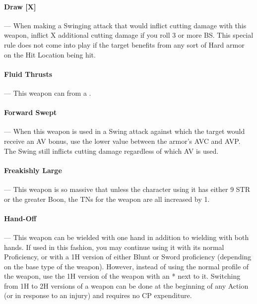 \documentclass[oneside,11pt,english]{book}
\begin{document}
\vspace{-5pt}\paragraph[Draw]{\label{wepqual:Draw}Draw [X]}---\quad
When making a Swinging attack that would inflict cutting damage with this
weapon, inflict X additional cutting damage if you roll 3 or more BS. This
special rule does not come into play if the target benefits from any sort of
Hard armor on the Hit Location being hit. 

\vspace{-5pt}\paragraph{\label{wepqual:Fluid Thrusts}Fluid Thrusts}---\quad
This weapon can  from a .

\vspace{-5pt}\paragraph{\label{wepqual:Forward Swept}Forward Swept}---\quad
When this weapon is used in a Swing attack against which the target would
receive an AV bonus, use the lower value between the armor’s AVC and AVP. The
Swing still inflicts cutting damage regardless of which AV is used. 

\vspace{-5pt}\paragraph{\label{wepqual:Freakishly Large}Freakishly Large}---\quad
This weapon is so massive that unless the character using it has either 9 STR or the greater  Boon, the TNs for the weapon are all increased by 1.

\vspace{-5pt}\paragraph{\label{wepqual:Hand-Off}Hand-Off}---\quad
This weapon can be wielded with one hand in addition to wielding with both
hands. If used in this fashion, you may continue using it with its normal
Proficiency, or with a 1H version of either Blunt or Sword proficiency
(depending on the base type of the weapon). However, instead of using the normal
profile of the weapon, use the 1H version of the weapon with an * next to it.
Switching from 1H to 2H versions of a weapon can be done at the beginning of any
Action (or in response to an injury) and requires no CP expenditure. 
\end{document}
